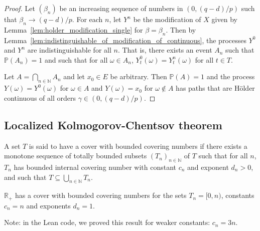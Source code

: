 \begin{proof}\leanok
Let $(\beta_n)$ be an increasing sequence of numbers in $(0, (q - d)/p)$ such that $\beta_n \to (q - d)/p$.
For each $n$, let $Y^n$ be the modification of $X$ given by Lemma~\ref{lem:holder_modification_single} for $\beta = \beta_n$.
Then by Lemma~\ref{lem:indistinguishable_of_modification_of_continuous}, the processes $Y^0$ and $Y^n$ are indistinguishable for all $n$.
That is, there exists an event $A_n$ such that $\mathbb{P}(A_n) = 1$ and such that for all $\omega \in A_n$, $Y^0_t(\omega) = Y^n_t(\omega)$ for all $t \in T$.

Let $A = \bigcap_{n \in \mathbb{N}} A_n$ and let $x_0 \in E$ be arbitrary.
Then $\mathbb{P}(A) = 1$ and the process $Y(\omega) = Y^0(\omega)$ for $\omega \in A$ and $Y(\omega) = x_0$ for $\omega \notin A$ has paths that are Hölder continuous of all orders $\gamma \in (0, (q - d)/p)$.
\end{proof}



\subsection{Localized Kolmogorov-Chentsov theorem}

\begin{definition}\label{def:HasBoundedCoveringNumberCover}
  \leanok
A set $T$ is said to have a cover with bounded covering numbers if there exists a monotone sequence of totally bounded subsets $(T_n)_{n \in \mathbb{N}}$ of $T$ such that for all $n$, $T_n$ has bounded internal covering number with constant $c_n$ and exponent $d_n > 0$, and such that $T \subseteq \bigcup_{n \in \mathbb{N}} T_n$.
\end{definition}


\begin{lemma}\label{lem:hasBoundedCoveringNumberCover_nnreal}
  \leanok
$\mathbb{R}_+$ has a cover with bounded covering numbers for the sets $T_n = [0,n)$, constants $c_n = n$ and exponents $d_n = 1$.
\end{lemma}

Note: in the Lean code, we proved this result for weaker constants: $c_n = 3n$.

